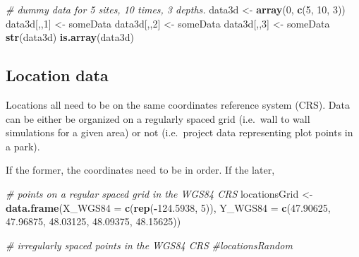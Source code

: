 \documentclass[
]{article}
\newenvironment{Shaded}{\begin{snugshade}}{\end{snugshade}}
\newcommand{\CommentTok}[1]{\textcolor[rgb]{0.56,0.35,0.01}{\textit{#1}}}
\newcommand{\DataTypeTok}[1]{\textcolor[rgb]{0.13,0.29,0.53}{#1}}
\newcommand{\DecValTok}[1]{\textcolor[rgb]{0.00,0.00,0.81}{#1}}
\newcommand{\FloatTok}[1]{\textcolor[rgb]{0.00,0.00,0.81}{#1}}
\newcommand{\KeywordTok}[1]{\textcolor[rgb]{0.13,0.29,0.53}{\textbf{#1}}}
\newcommand{\NormalTok}[1]{#1}
\newcommand{\OperatorTok}[1]{\textcolor[rgb]{0.81,0.36,0.00}{\textbf{#1}}}
\newcommand{\StringTok}[1]{\textcolor[rgb]{0.31,0.60,0.02}{#1}}
\begin{document}
\begin{Shaded}
\begin{Highlighting}[]
  \CommentTok{\# dummy data for 5 sites, 10 times, 3 depths.}
\NormalTok{  data3d \textless{}{-}}\StringTok{ }\KeywordTok{array}\NormalTok{(}\DecValTok{0}\NormalTok{, }\KeywordTok{c}\NormalTok{(}\DecValTok{5}\NormalTok{, }\DecValTok{10}\NormalTok{, }\DecValTok{3}\NormalTok{))}
\NormalTok{  data3d[,,}\DecValTok{1}\NormalTok{] \textless{}{-}}\StringTok{ }\NormalTok{someData}
\NormalTok{  data3d[,,}\DecValTok{2}\NormalTok{] \textless{}{-}}\StringTok{ }\NormalTok{someData}
\NormalTok{  data3d[,,}\DecValTok{3}\NormalTok{] \textless{}{-}}\StringTok{ }\NormalTok{someData}
  \KeywordTok{str}\NormalTok{(data3d)}
  \KeywordTok{is.array}\NormalTok{(data3d)}
\end{Highlighting}
\end{Shaded}

\hypertarget{location-data}{%
\subsection{Location data}\label{location-data}}

Locations all need to be on the same coordinates reference system (CRS). Data can
be either be organized on a regularly spaced grid (i.e.~wall to wall simulations for
a given area) or not (i.e.~project data representing plot points in a park).

If the former, the coordinates need to be in order. If the later,

\begin{Shaded}
\begin{Highlighting}[]
  \CommentTok{\# points on a regular spaced grid in the WGS84 CRS}
\NormalTok{  locationsGrid \textless{}{-}}\StringTok{ }\KeywordTok{data.frame}\NormalTok{(}\DataTypeTok{X\_WGS84 =} \KeywordTok{c}\NormalTok{(}\KeywordTok{rep}\NormalTok{(}\OperatorTok{{-}}\FloatTok{124.5938}\NormalTok{, }\DecValTok{5}\NormalTok{)),}
                        \DataTypeTok{Y\_WGS84 =} \KeywordTok{c}\NormalTok{(}\FloatTok{47.90625}\NormalTok{, }\FloatTok{47.96875}\NormalTok{, }\FloatTok{48.03125}\NormalTok{, }\FloatTok{48.09375}\NormalTok{,}
                                     \FloatTok{48.15625}\NormalTok{))}
   
  \CommentTok{\# irregularly spaced points in the WGS84 CRS}
  \CommentTok{\#locationsRandom}
\end{Highlighting}
\end{Shaded}
\end{document}
